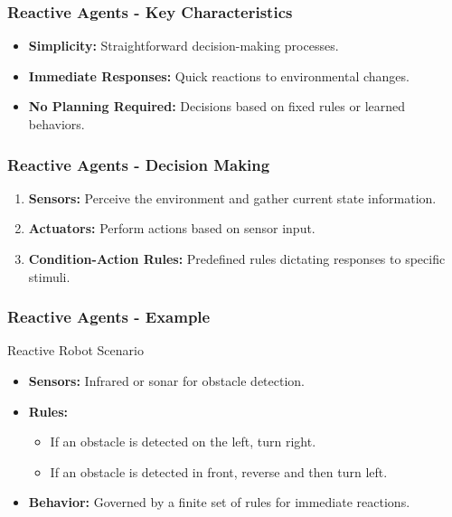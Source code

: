 \documentclass[aspectratio=169]{beamer}
\begin{document}
\begin{frame}[fragile]
    \frametitle{Reactive Agents - Key Characteristics}
    \begin{itemize}
        \item \textbf{Simplicity:} Straightforward decision-making processes.
        \item \textbf{Immediate Responses:} Quick reactions to environmental changes.
        \item \textbf{No Planning Required:} Decisions based on fixed rules or learned behaviors.
    \end{itemize}
\end{frame}

\begin{frame}[fragile]
    \frametitle{Reactive Agents - Decision Making}
    \begin{enumerate}
        \item \textbf{Sensors:} Perceive the environment and gather current state information.
        \item \textbf{Actuators:} Perform actions based on sensor input.
        \item \textbf{Condition-Action Rules:} Predefined rules dictating responses to specific stimuli.
    \end{enumerate}
\end{frame}

\begin{frame}[fragile]
    \frametitle{Reactive Agents - Example}
    \begin{block}{Reactive Robot Scenario}
        \begin{itemize}
            \item \textbf{Sensors:} Infrared or sonar for obstacle detection.
            \item \textbf{Rules:}
            \begin{itemize}
                \item If an obstacle is detected on the left, turn right.
                \item If an obstacle is detected in front, reverse and then turn left.
            \end{itemize}
            \item \textbf{Behavior:} Governed by a finite set of rules for immediate reactions.
        \end{itemize}
    \end{block}
\end{frame}
\end{document}
